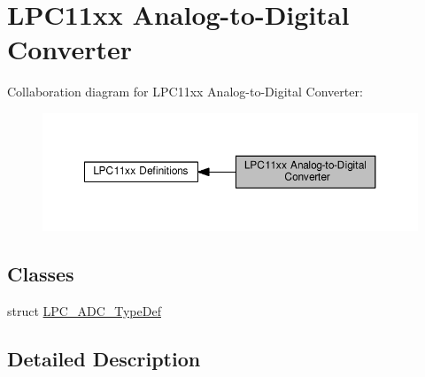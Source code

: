\hypertarget{group___l_p_c11xx___a_d_c}{}\section{L\+P\+C11xx Analog-\/to-\/\+Digital Converter}
\label{group___l_p_c11xx___a_d_c}
Collaboration diagram for L\+P\+C11xx Analog-\/to-\/\+Digital Converter\+:\nopagebreak
\begin{figure}[H]
\begin{center}
\leavevmode
\includegraphics[width=350pt]{group___l_p_c11xx___a_d_c}
\end{center}
\end{figure}
\subsection*{Classes}
\begin{DoxyCompactItemize}
\item 
struct \hyperlink{struct_l_p_c___a_d_c___type_def}{L\+P\+C\+\_\+\+A\+D\+C\+\_\+\+Type\+Def}
\end{DoxyCompactItemize}


\subsection{Detailed Description}
